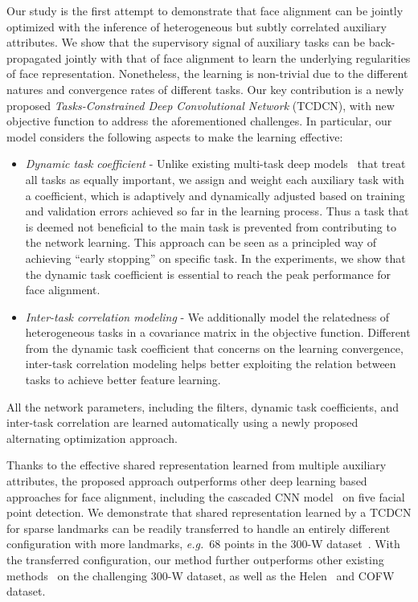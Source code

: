 \documentclass[10pt,journal,compsoc]{IEEEtran}
\newcommand{\eg}{\emph{e.g.}}
\begin{document}
Our study is the first attempt to demonstrate that face alignment can be jointly optimized with the inference of heterogeneous but subtly correlated auxiliary attributes.
We show that the supervisory signal of auxiliary tasks can be back-propagated jointly with that of face alignment to learn the underlying regularities of face representation.
Nonetheless, the learning is non-trivial due to the different natures and convergence rates of different tasks.
Our key contribution is a newly proposed \textit{Tasks-Constrained Deep Convolutional Network} (TCDCN), with new objective function to address the aforementioned challenges.
In particular, our model considers the following aspects to make the learning effective:
\begin{itemize}
\item \textit{Dynamic task coefficient} -
Unlike existing multi-task deep models~\cite{ahmed2008training,weston2012deep,ABC} that treat all tasks as equally important, we assign and weight each auxiliary task with a coefficient, which is adaptively and dynamically adjusted based on training and validation errors achieved so far in the learning process. Thus a task that is deemed not beneficial to the main task is prevented from contributing to the network learning. This approach can be seen as a principled way of achieving ``early stopping'' on specific task.
In the experiments, we show that the dynamic task coefficient is essential to reach the peak performance for face alignment.
\item \textit{Inter-task correlation modeling} - We additionally model the relatedness of heterogeneous tasks in a covariance matrix in the objective function. Different from the dynamic task coefficient that concerns on the learning convergence, inter-task correlation modeling helps better exploiting the relation between tasks to achieve better feature learning.
\end{itemize}
All the network parameters, including the filters, dynamic task coefficients, and inter-task correlation are learned automatically using a newly proposed alternating optimization approach.

Thanks to the effective shared representation learned from multiple auxiliary attributes, the proposed approach outperforms other deep learning based approaches for face alignment, including the cascaded CNN model~\cite{Sun2013} on five facial point detection.
We demonstrate that shared representation learned by a TCDCN for sparse landmarks can be readily transferred to handle an entirely different configuration with more landmarks, \eg~68 points in the 300-W dataset~\cite{300w}. With the transferred configuration, our method further outperforms other existing methods~\cite{dollar13,Cao2012,6618919,Yu2013,Zhu2012,zhang2014coarse,300w_lbp} on the challenging 300-W dataset, as well as the Helen~\cite{Helen} and COFW~\cite{dollar13} dataset.
\end{document}
